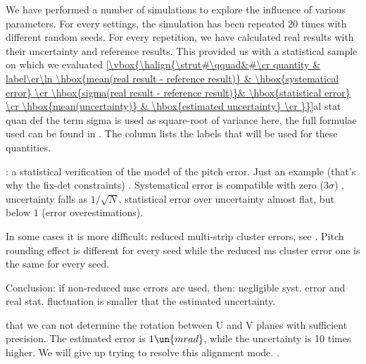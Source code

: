 
We have performed a number of simulations to explore the influence of various parameters. For every settings, the simulation has been repeated 20 times with different random seeds. For every repetition, we have calculated real results with their uncertainty and reference results. This provided us with a statistical sample on which we evaluated
\eqref{\vbox{\halign{\strut#\qquad&#\cr
quantity & label\cr\ln
\hbox{mean(real result - reference result)}	& \hbox{systematical error} \cr
\hbox{sigma(real result - reference result)}& \hbox{statistical error} \cr
\hbox{mean(uncertainty)} 					& \hbox{estimated uncertainty} \cr
}}}{al stat quan def}
the term sigma is used as square-root of variance here, the full formulae used can be found in . The \rhs{} column lists the labels that will be used for these quantities.

: a statistical verification of the model of the pitch error. Just an example (that's why the fix-det constraints) . Systematical error is compatible with zero ($3\sigma$) , uncertainty falls as $1/\sqrt{N}$, statistical error over uncertainty almost flat, but below $1$ (error overestimations).


In some cases it is more difficult: reduced multi-strip cluster errors, see . Pitch rounding effect is different for every seed while the reduced ms cluster error one is the same for every seed.


Conclusion: if non-reduced msc errors are used, then: negligible syst. error and real stat. fluctuation is smaller that the estimated uncertainty.

 that we can not determine the rotation between U and V planes with sufficient precision. The estimated error is $1\un{mrad}$, while the uncertainty is 10 times higher. We will give up trying to resolve this alignment mode. .

